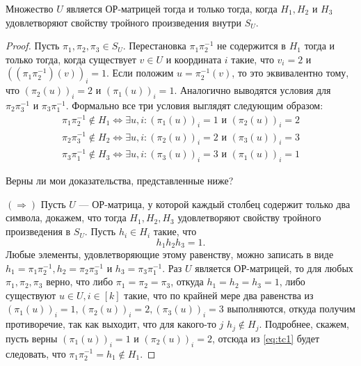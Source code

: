 \begin{lemma}\label{lem:05:3.7}
  Множество $U$ является ОР-матрицей тогда и только тогда, когда $H_1,H_2$ и $H_3$ удовлетворяют свойству тройного произведения внутри $S_U$.
\end{lemma}
\begin{proof}
Пусть $\pi_1, \pi_2, \pi_3 \in S_U$. Перестановка $\pi_1 \pi_2^{-1}$ не содержится в $H_1$ тогда и только тогда, когда существует $v \in U$ и координата $i$ такие, что $v_i = 2$ и $((\pi_1 \pi_2^{-1})(v))_i=1$. Если положим $u=\pi_2^{-1}(v)$, то это эквивалентно тому, что $(\pi_2(u))_i=2$ и $(\pi_1(u))_i=1$. Аналогично выводятся условия для $\pi_2 \pi_3^{-1}$ и $\pi_3 \pi_1^{-1}$. Формально все три условия выглядят следующим образом:
\begin{align}
	\label{eq:tc1}
	\pi_1 \pi_2^{-1} \notin H_1  \iff \exists u, i :  (\pi_1(u))_i=1 \text{ и } (\pi_2(u))_i=2\\
	\label{eq:tc2}
	\pi_2 \pi_3^{-1} \notin H_2  \iff \exists u, i :  (\pi_2(u))_i=2 \text{ и } (\pi_3(u))_i=3\\
	\label{eq:tc3}
	\pi_3 \pi_1^{-1} \notin H_3  \iff \exists u, i :  (\pi_3(u))_i=3 \text{ и } (\pi_1(u))_i=1
\end{align}

\begin{question}
  Верны ли мои доказательства, представленные ниже?
\end{question}
$(\Longrightarrow)$ Пусть $U$ --- ОР-матрица, у которой каждый столбец содержит только два символа, докажем, что тогда $H_1, H_2, H_3$ удовлетворяют свойству тройного произведения в $S_U$.
Пусть $h_i \in H_i$ такие, что 
\[
	h_1 h_2 h_3 = 1.
\]
Любые элементы, удовлетворяющие этому равенству, можно записать в виде $h_1 = \pi_1 \pi_2^{-1}, h_2 = \pi_2 \pi_3^{-1}$ и $h_3 = \pi_3 \pi_1^{-1}$. Раз $U$ является ОР-матрицей, то для любых $\pi_1, \pi_2, \pi_3$ верно, что либо $\pi_1= \pi_2= \pi_3$, откуда $h_1=h_2=h_3=1$, либо существуют $u \in U, i \in [k]$ такие, что по крайней мере два равенства из $(\pi_1(u))_i=1, (\pi_2(u))_i=2, (\pi_3(u))_i=3$ выполняются, откуда получим противоречие, так как выходит, что для какого-то $j$ $h_j \notin H_j$. Подробнее, скажем, пусть верны $(\pi_1(u))_i=1$ и $(\pi_2(u))_i=2$, отсюда из \eqref{eq:tc1} будет следовать, что $\pi_1 \pi_2^{-1} = h_1 \notin H_1$.


\end{proof}
